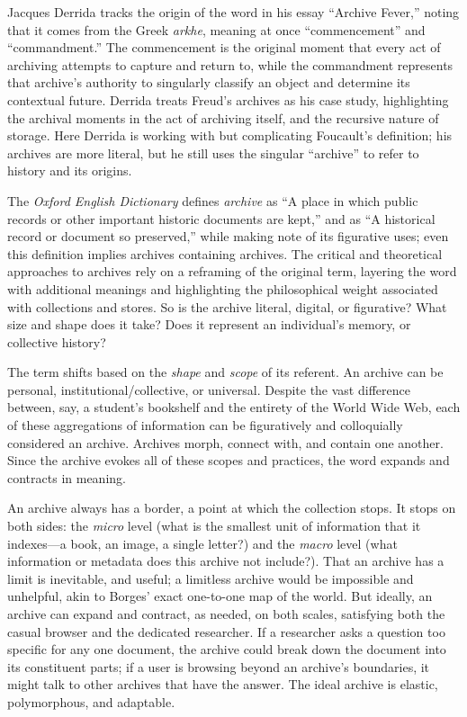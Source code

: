 Jacques Derrida tracks the origin of the word in his essay ``Archive Fever,'' noting that it comes from the Greek \emph{arkhe}, meaning at once ``commencement'' and ``commandment.''\autocite[9]{derrida_archive_1995} The commencement is the original moment that every act of archiving attempts to capture and return to, while the commandment represents that archive's authority to singularly classify an object and determine its contextual future. Derrida treats Freud's archives as his case study, highlighting the archival moments in the act of archiving itself, and the recursive nature of storage. Here Derrida is working with but complicating Foucault's definition; his archives are more literal, but he still uses the singular ``archive'' to refer to history and its origins.

The \emph{Oxford English Dictionary} defines \emph{archive} as ``A place in which public records or other important historic documents are kept,'' and as ``A historical record or document so preserved,'' while making note of its figurative uses; even this definition implies archives containing archives. The critical and theoretical approaches to archives rely on a reframing of the original term, layering the word with additional meanings and highlighting the philosophical weight associated with collections and stores. So is the archive literal, digital, or figurative? What size and shape does it take? Does it represent an individual's memory, or collective history?

The term shifts based on the \emph{shape} and \emph{scope} of its referent. An archive can be personal, institutional/collective, or universal. Despite the vast difference between, say, a student's bookshelf and the entirety of the World Wide Web, each of these aggregations of information can be figuratively and colloquially considered an archive. Archives morph, connect with, and contain one another. Since the archive evokes all of these scopes and practices, the word expands and contracts in meaning.

An archive always has a border, a point at which the collection stops. It stops on both sides: the \emph{micro} level (what is the smallest unit of information that it indexes---a book, an image, a single letter?) and the \emph{macro} level (what information or metadata does this archive not include?). That an archive has a limit is inevitable, and useful; a limitless archive would be impossible and unhelpful, akin to Borges' exact one-to-one map of the world.\autocite[325]{borges_collected_1999} But ideally, an archive can expand and contract, as needed, on both scales, satisfying both the casual browser and the dedicated researcher. If a researcher asks a question too specific for any one document, the archive could break down the document into its constituent parts; if a user is browsing beyond an archive's boundaries, it might talk to other archives that have the answer. The ideal archive is elastic, polymorphous, and adaptable.

